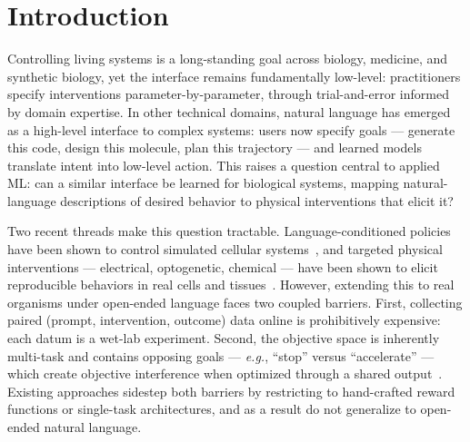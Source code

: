 \documentclass{article}
\begin{document}
\section{Introduction}


Controlling living systems is a long-standing goal across biology, medicine, and synthetic biology, yet the interface remains fundamentally low-level: practitioners specify interventions parameter-by-parameter, through trial-and-error informed by domain expertise. In other technical domains, natural language has emerged as a high-level interface to complex systems: users now specify goals — generate this code, design this molecule, plan this trajectory — and learned models translate intent into low-level action. This raises a question central to applied ML: can a similar interface be learned for biological systems, mapping natural-language descriptions of desired behavior to physical interventions that elicit it?



Two recent threads make this question tractable. Language-conditioned policies have been shown to control simulated cellular systems~\cite{Le2025zapgpt, le2025giving}, and targeted physical interventions — electrical, optogenetic, chemical — have been shown to elicit reproducible behaviors in real cells and tissues~\cite{zajdel2020scheepdog, levin2021bioelectric}. However, extending this to real organisms under open-ended language faces two coupled barriers. First, collecting paired (prompt, intervention, outcome) data online is prohibitively expensive: each datum is a wet-lab experiment. Second, the objective space is inherently multi-task and contains opposing goals — \textit{e.g.}, ``stop'' versus ``accelerate'' — which create objective interference when optimized through a shared output~\cite{pcgrad, chen2018gradnorm}. Existing approaches sidestep both barriers by restricting to hand-crafted reward functions or single-task architectures, and as a result do not generalize to open-ended natural language.


\end{document}
